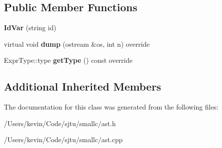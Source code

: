 \subsection*{Public Member Functions}
\begin{DoxyCompactItemize}
\item 
\mbox{\label{class_id_var_a6fcaa618b1bd04acb3cae1f42bd8536a}} 
{\bfseries Id\+Var} (string id)
\item 
\mbox{\label{class_id_var_a60a26d450fd1d269f0462444a90054cf}} 
virtual void {\bfseries dump} (ostream \&os, int n) override
\item 
\mbox{\label{class_id_var_a1a965ceb0bd0f3856ef7f1dde75b5c6e}} 
Expr\+Type\+::type {\bfseries get\+Type} () const override
\end{DoxyCompactItemize}
\subsection*{Additional Inherited Members}


The documentation for this class was generated from the following files\+:\begin{DoxyCompactItemize}
\item 
/\+Users/kevin/\+Code/sjtu/smallc/ast.\+h\item 
/\+Users/kevin/\+Code/sjtu/smallc/ast.\+cpp\end{DoxyCompactItemize}
